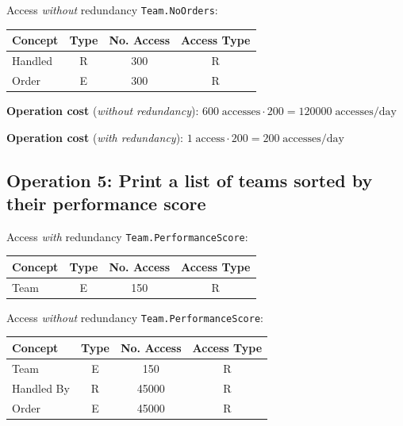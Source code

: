         Access \textit{without} redundancy \texttt{Team.NoOrders}:
    
    \begin{table}[h!]
        \centering
        \begin{tabular}{|l|c|c|c|}
            \hline
            \textbf{Concept} & \textbf{Type} & \textbf{No. Access} & \textbf{Access Type} \\
            \hline
            Handled & R & 300 & R \\
            \hline
            Order  & E & 300 & R \\
            \hline
        \end{tabular}
    \end{table}
    
    \textbf{Operation cost} (\textit{without redundancy}): $600 \; \text{accesses} \cdot 200 = 120000 \; \text{accesses/day}$

    \textbf{Operation cost} (\textit{with redundancy}): $1 \; \text{access} \cdot 200 = 200 \; \text{accesses/day}$  


    \subsection*{Operation 5: Print a list of teams sorted by their performance score}
    
    Access \textit{with} redundancy \texttt{Team.PerformanceScore}:
    
    \begin{table}[h!]
    \centering
    \begin{tabular}{|l|c|c|c|}
    \hline
    \textbf{Concept} & \textbf{Type} & \textbf{No. Access} & \textbf{Access Type} \\
    \hline
    Team    & E & 150 & R \\
    \hline
    \end{tabular}
    \end{table}
    
    Access \textit{without} redundancy \texttt{Team.PerformanceScore}:
    
    \begin{table}[h!]
    \centering
    \begin{tabular}{|l|c|c|c|}
    \hline
    \textbf{Concept} & \textbf{Type} & \textbf{No. Access} & \textbf{Access Type} \\
    \hline
    Team       & E & 150    & R \\
    \hline
    Handled By & R & 45000  & R \\
    \hline
    Order      & E & 45000  & R \\
    \hline
    \end{tabular}
    \end{table}
    
